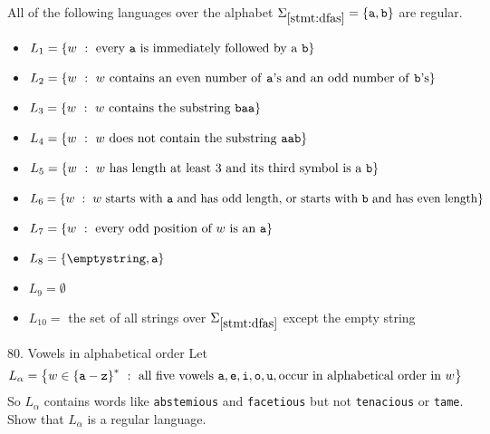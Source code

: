 \documentclass[10pt]{article}
\begin{document}
\begin{stmtsoln}{79}
All of the following languages over the alphabet $\Sigma_{\ref{stmt:dfas}} = \left\lbrace \texttt{a}, \texttt{b} \right\rbrace$ are regular.
\begin{itemize}
\item $L_1 = \left\lbrace w\ :\ \textrm{every \texttt{a} is immediately followed by a \texttt{b}} \right\rbrace$
\item $L_2 = \left\lbrace w\ :\ w~\textrm{contains an even number of \texttt{a}'s and an odd number of \texttt{b}'s} \right\rbrace$
\item $L_3 = \left\lbrace w\ :\ w~\textrm{contains the substring \texttt{baa}} \right\rbrace$
\item $L_4 = \left\lbrace w\ :\ w~\textrm{does not contain the substring \texttt{aab}} \right\rbrace$
\item $L_5 = \left\lbrace w\ :\ w~\textrm{has length at least 3 and its third symbol is a}~\texttt{b} \right\rbrace$
\item $L_6 = \left\lbrace w\ :\ w~\textrm{starts with \texttt{a} and has odd length, or starts with \texttt{b} and has even length} \right\rbrace$
\item $L_7 = \left\lbrace w\ :\ \textrm{every odd position of}~w~\textrm{is an}~\texttt{a} \right\rbrace$
\item $L_8 = \setdef{\emptystring, \texttt{a}}$
\item $L_9 = \emptyset$
\item $L_{10} = $ the set of all strings over $\Sigma_{\ref{stmt:dfas}}$ except the empty string
\end{itemize}
\end{stmtsoln}

\begin{exersoln}{80. Vowels in alphabetical order}
Let \[L_\alpha = \setbuild{w \in \setstar{\setdef{\texttt{a} - \texttt{z}}}}{\textrm{all five vowels}\ \texttt{a}, \texttt{e},
			\texttt{i}, \texttt{o}, \texttt{u}, \textrm{occur in alphabetical order in}~w}\]
So $L_\alpha$ contains words like \texttt{abstemious} and \texttt{facetious} but not \texttt{tenacious} or \texttt{tame}. Show that $L_\alpha$ is a regular language.
\end{exersoln}
\end{document}
